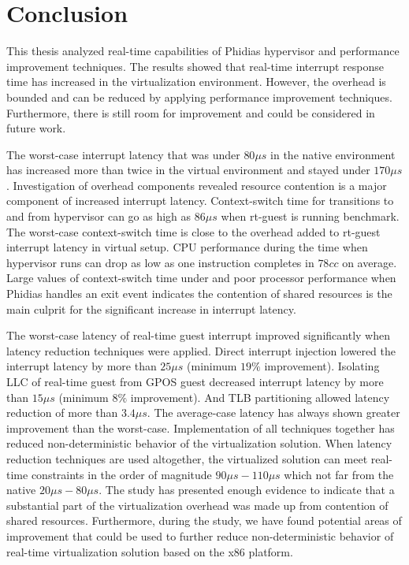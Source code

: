 \chapter{Conclusion\label{chap6}}

This thesis analyzed real-time capabilities of Phidias hypervisor and performance improvement techniques.
The results showed that real-time interrupt response time has increased in the virtualization environment.
However, the overhead is bounded and can be reduced by applying performance improvement techniques.
Furthermore, there is still room for improvement and could be considered in future work.

The worst-case interrupt latency that was under $80\mu{}s$ in the native environment has increased 
more than twice in the virtual environment and stayed under $170\mu{}s$.
Investigation of overhead components revealed resource contention is a major component of increased interrupt latency.
Context-switch time for transitions to and from hypervisor can go as high as $86\mu{}s$ when rt-guest is running \mcachepressure{} benchmark.
The worst-case context-switch time is close to the overhead added to rt-guest interrupt latency in virtual setup.
CPU performance during the time when hypervisor runs can drop as low as one instruction completes in $78cc$ on average.
Large values of context-switch time under \mcachepressure{} and poor processor performance when Phidias handles an exit event indicates 
the contention of shared resources is the main culprit for the significant increase in interrupt latency.

The worst-case latency of real-time guest interrupt improved significantly when latency reduction techniques were applied.
Direct interrupt injection lowered the interrupt latency by more than $25\mu{}s$ (minimum $19\%$ improvement).
Isolating LLC of real-time guest from GPOS guest decreased interrupt latency by more than $15\mu{}s$ (minimum $8\%$ improvement).
And TLB partitioning allowed latency reduction of more than $3.4\mu{}s$.
The average-case latency has always shown greater improvement than the worst-case.
Implementation of all techniques together has reduced non-deterministic behavior of the virtualization solution.
When latency reduction techniques are used altogether, the virtualized solution can meet real-time constraints in the order of magnitude $90\mu{}s-110\mu{}s$ which not far from the native $20\mu{}s-80\mu{}s$.
The study has presented enough evidence to indicate that a substantial part of the virtualization overhead was made up from contention of shared resources.
Furthermore, during the study, we have found potential areas of improvement that could be used to further reduce non-deterministic behavior of real-time virtualization solution based on the x86 platform.


